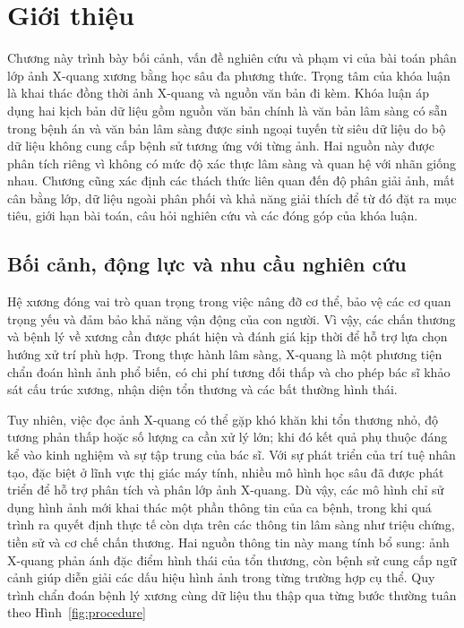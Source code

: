 \chapter{Giới thiệu}
\label{Chapter1}

Chương này trình bày bối cảnh, vấn đề nghiên cứu và phạm vi của bài toán phân lớp ảnh X-quang xương bằng học sâu đa phương thức. Trọng tâm của khóa luận là khai thác đồng thời ảnh X-quang và nguồn văn bản đi kèm. Khóa luận áp dụng hai kịch bản dữ liệu gồm nguồn văn bản chính là văn bản lâm sàng có sẵn trong bệnh án và văn bản lâm sàng được sinh ngoại tuyến từ siêu dữ liệu do bộ dữ liệu không cung cấp bệnh sử tương ứng với từng ảnh. Hai nguồn này được phân tích riêng vì không có mức độ xác thực lâm sàng và quan hệ với nhãn giống nhau. Chương cũng xác định các thách thức liên quan đến độ phân giải ảnh, mất cân bằng lớp, dữ liệu ngoài phân phối và khả năng giải thích để từ đó đặt ra mục tiêu, giới hạn bài toán, câu hỏi nghiên cứu và các đóng góp của khóa luận.

\section{Bối cảnh, động lực và nhu cầu nghiên cứu}

Hệ xương đóng vai trò quan trọng trong việc nâng đỡ cơ thể, bảo vệ các cơ quan trọng yếu và đảm bảo khả năng vận động của con người. Vì vậy, các chấn thương và bệnh lý về xương cần được phát hiện và đánh giá kịp thời để hỗ trợ lựa chọn hướng xử trí phù hợp. Trong thực hành lâm sàng, X-quang là một phương tiện chẩn đoán hình ảnh phổ biến, có chi phí tương đối thấp và cho phép bác sĩ khảo sát cấu trúc xương, nhận diện tổn thương và các bất thường hình thái.

Tuy nhiên, việc đọc ảnh X-quang có thể gặp khó khăn khi tổn thương nhỏ, độ tương phản thấp hoặc số lượng ca cần xử lý lớn; khi đó kết quả phụ thuộc đáng kể vào kinh nghiệm và sự tập trung của bác sĩ. Với sự phát triển của trí tuệ nhân tạo, đặc biệt ở lĩnh vực thị giác máy tính, nhiều mô hình học sâu đã được phát triển để hỗ trợ phân tích và phân lớp ảnh X-quang. Dù vậy, các mô hình chỉ sử dụng hình ảnh mới khai thác một phần thông tin của ca bệnh, trong khi quá trình ra quyết định thực tế còn dựa trên các thông tin lâm sàng như triệu chứng, tiền sử và cơ chế chấn thương. Hai nguồn thông tin này mang tính bổ sung: ảnh X-quang phản ánh đặc điểm hình thái của tổn thương, còn bệnh sử cung cấp ngữ cảnh giúp diễn giải các dấu hiệu hình ảnh trong từng trường hợp cụ thể. Quy trình chẩn đoán bệnh lý xương cùng dữ liệu thu thập qua từng bước thường tuân theo Hình~\ref{fig:procedure}

